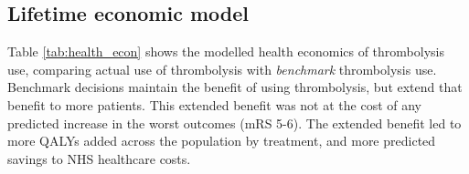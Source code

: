\begin{minipage}{1\textwidth}
\begin{longtable}{p{5.2cm} | p{1.6cm} p{1.6cm} p{1.5cm} | p{1.6cm} p{1.6cm} p{1.5cm}}
\bottomrule
\end{longtable}

\normalsize
\end{minipage}

\subsection{Lifetime economic model}

Table \ref{tab:health_econ} shows the modelled health economics of thrombolysis use, comparing actual use of thrombolysis with \textit{benchmark} thrombolysis use. Benchmark decisions maintain the benefit of using thrombolysis, but extend that benefit to more patients. This extended benefit was not at the cost of any predicted increase in the worst outcomes (mRS 5-6). The extended benefit led to more QALYs added across the population by treatment, and more predicted savings to NHS healthcare costs.

